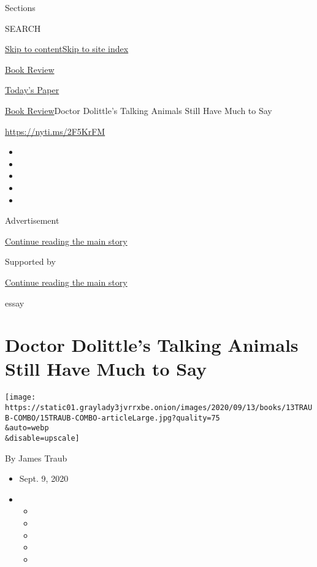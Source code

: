 Sections

SEARCH

\protect\hyperlink{site-content}{Skip to
content}\protect\hyperlink{site-index}{Skip to site index}

\href{https://www.nytimes3xbfgragh.onion/section/books/review}{Book
Review}

\href{https://myaccount.nytimes3xbfgragh.onion/auth/login?response_type=cookie\&client_id=vi}{}

\href{https://www.nytimes3xbfgragh.onion/section/todayspaper}{Today's
Paper}

\href{/section/books/review}{Book Review}\textbar{}Doctor Dolittle's
Talking Animals Still Have Much to Say

\url{https://nyti.ms/2F5KrFM}

\begin{itemize}
\item
\item
\item
\item
\item
\end{itemize}

Advertisement

\protect\hyperlink{after-top}{Continue reading the main story}

Supported by

\protect\hyperlink{after-sponsor}{Continue reading the main story}

essay

\hypertarget{doctor-dolittles-talking-animals-still-have-much-to-say}{%
\section{Doctor Dolittle's Talking Animals Still Have Much to
Say}\label{doctor-dolittles-talking-animals-still-have-much-to-say}}

\texttt{[image: https://static01.graylady3jvrrxbe.onion/images/2020/09/13/books/13TRAUB-COMBO/15TRAUB-COMBO-articleLarge.jpg?quality=75\\\&auto=webp\\\&disable=upscale]}

By James Traub

\begin{itemize}
\item
  Sept. 9, 2020
\item
  \begin{itemize}
  \item
  \item
  \item
  \item
  \item
  \end{itemize}
\end{itemize}

